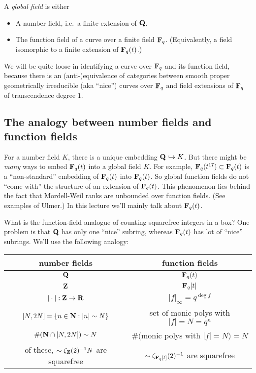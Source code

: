 \begin{defi}
A \emph{global field} is either 
\begin{itemize}
  \item A number field, i.e.~a finite extension of $\mathbf{Q}$. 
  \item The function field of a curve over a finite field $\mathbf{F}_q$. 
    (Equivalently, a field isomorphic to a finite extension of $\mathbf{F}_q(t)$.)
\end{itemize}
\end{defi}

We will be quite loose in identifying a curve over $\mathbf{F}_q$ and its function 
field, because there is an (anti-)equivalence of categories between smooth 
proper geometrically irreducible (aka ``nice'') curves over $\mathbf{F}_q$ and 
field extensions of $\mathbf{F}_q$ of transcendence degree $1$. 





\subsection{The analogy between number fields and function fields}

For a number field $K$, there is a unique embedding $\mathbf{Q}\hookrightarrow K$. But 
there might be \emph{many} ways to embed $\mathbf{F}_q(t)$ into a global field $K$. 
For example, $\mathbf{F}_q(t^{17})\subset\mathbf{F}_q(t)$ is a ``non-standard'' embedding of 
$\mathbf{F}_q(t)$ into $\mathbf{F}_q(t)$. So global function fields do not ``come with'' the 
structure of an extension of $\mathbf{F}_q(t)$. This phenomenon lies behind the fact 
that Mordell-Weil ranks are unbounded over function fields. (See examples of 
Ulmer.) In this lecture we'll mainly talk about $\mathbf{F}_q(t)$. 

What is the function-field analogue of counting squarefree integers in a box? 
One problem is that $\mathbf{Q}$ has only one ``nice'' subring, whereas $\mathbf{F}_q(t)$ has 
lot of ``nice'' subrings. We'll use the following analogy:
\begin{center}
\begin{tabular}{c|c}
number fields & function fields \\ \hline
$\mathbf{Q}$ & $\mathbf{F}_q(t)$ \\
$\mathbf{Z}$ & $\mathbf{F}_q[t]$ \\
$|\cdot|:\mathbf{Z}\to \mathbf{R}$ & $|f|_\infty = q^{\deg f}$ \\
$[N, 2 N]=\{n\in \mathbf{N}:|n|\sim N\}$ & set of monic polys with $|f|= N=q^n$ \\
$\#(\mathbf{N}\cap [N,2 N])\sim N$ & $\#($monic polys with $|f|=N)=N$ \\
of these, $\sim \zeta_{\mathbf{Z}}(2)^{-1} N$ are squarefree & $\sim \zeta_{\mathbf{F}_q[t]}(2)^{-1}$ are squarefree
\end{tabular}
\end{center}

